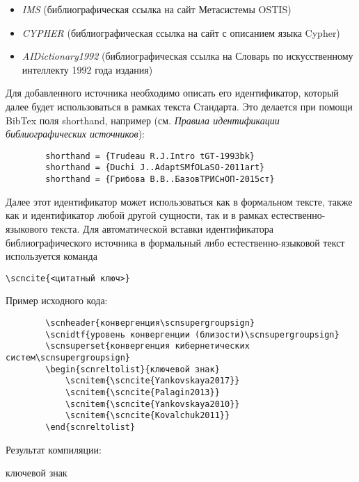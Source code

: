 \begin{itemize}
	\begin{itemize}
		\item \textit{IMS} (библиографическая ссылка на сайт Метасистемы OSTIS)
		\item \textit{CYPHER} (библиографическая ссылка на сайт с описанием языка Cypher)
		\item \textit{AIDictionary1992} (библиографическая ссылка на Словарь по искусственному интеллекту 1992 года издания)
	\end{itemize}
	
	Для добавленного источника необходимо описать его идентификатор, который далее будет использоваться в рамках текста Стандарта. Это делается при помощи BibTex поля shorthand, например (см. \textit{Правила идентификации библиографических источников}):
	
	\begin{verbatim}
		shorthand = {Trudeau R.J.Intro tGT-1993bk}
		shorthand = {Duchi J..AdaptSMfOLaSO-2011art}
		shorthand = {Грибова В.В..БазовТРИСнОП-2015ст}
	\end{verbatim}
	
	Далее этот идентификатор может использоваться как в формальном тексте, также как и идентификатор любой другой сущности, так и в рамках естественно-языкового текста. Для автоматической вставки идентификатора библиографического источника в формальный либо естественно-языковой текст используется команда \begin{verbatim}\scncite{<цитатный ключ>}\end{verbatim}
	
	Пример исходного кода:
	
	\begin{verbatim}
		\scnheader{конвергенция\scnsupergroupsign}
		\scnidtf{уровень конвергенции (близости)\scnsupergroupsign}
		\scnsuperset{конвергенция кибернетических систем\scnsupergroupsign}
		\begin{scnreltolist}{ключевой знак}
			\scnitem{\scncite{Yankovskaya2017}}
			\scnitem{\scncite{Palagin2013}}
			\scnitem{\scncite{Yankovskaya2010}}
			\scnitem{\scncite{Kovalchuk2011}}
		\end{scnreltolist}		
	\end{verbatim}
	
	Результат компиляции:
	
	\begin{SCn}
		\begin{scnreltolist}{ключевой знак}
		\end{scnreltolist}
	\end{SCn}
	

\end{itemize}
